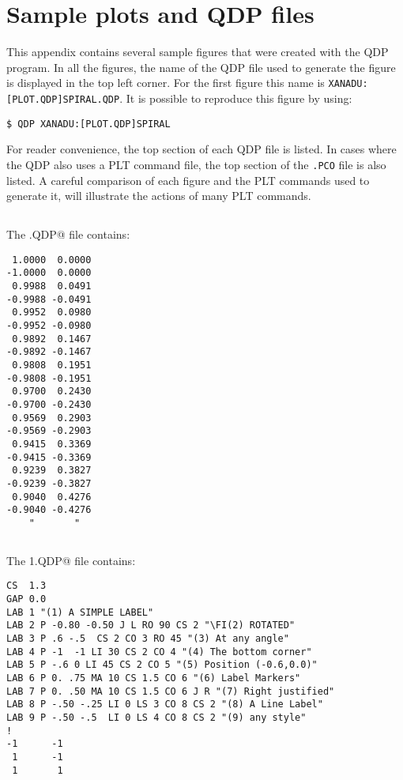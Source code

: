 \chapter{Sample plots and QDP files}
\label{samples}

This appendix contains several sample figures that were created
with the QDP program.
In all the figures, the name of the QDP file used to generate the
figure is displayed in the top left corner.
For the first figure this name is {\tt XANADU:[PLOT.QDP]SPIRAL.QDP}.
It is possible to reproduce this figure by using:
\begin{verbatim}
$ QDP XANADU:[PLOT.QDP]SPIRAL
\end{verbatim}

For reader convenience, the top section of each QDP file is listed.
In cases where the QDP also uses a PLT command file, the top section
of the {\tt .PCO} file is also listed.
A careful comparison of each figure and the PLT commands used to
generate it, will illustrate the actions of many PLT commands.

\newpage
\section*{ }
\vspace{10cm}

\vfill
The \verb@SPIRAL.QDP@ file contains:
{\footnotesize
\begin{verbatim}
 1.0000  0.0000
-1.0000  0.0000
 0.9988  0.0491
-0.9988 -0.0491
 0.9952  0.0980
-0.9952 -0.0980
 0.9892  0.1467
-0.9892 -0.1467
 0.9808  0.1951
-0.9808 -0.1951
 0.9700  0.2430
-0.9700 -0.2430
 0.9569  0.2903
-0.9569 -0.2903
 0.9415  0.3369
-0.9415 -0.3369
 0.9239  0.3827
-0.9239 -0.3827
 0.9040  0.4276
-0.9040 -0.4276
    "       "

\end{verbatim}}


\newpage
\section*{ }
\vspace{10cm}

\vfill
The \verb@FIG1.QDP@ file contains:
{\footnotesize
\begin{verbatim}
CS  1.3
GAP 0.0
LAB 1 "(1) A SIMPLE LABEL"
LAB 2 P -0.80 -0.50 J L RO 90 CS 2 "\FI(2) ROTATED"
LAB 3 P .6 -.5  CS 2 CO 3 RO 45 "(3) At any angle"
LAB 4 P -1  -1 LI 30 CS 2 CO 4 "(4) The bottom corner"
LAB 5 P -.6 0 LI 45 CS 2 CO 5 "(5) Position (-0.6,0.0)"
LAB 6 P 0. .75 MA 10 CS 1.5 CO 6 "(6) Label Markers"
LAB 7 P 0. .50 MA 10 CS 1.5 CO 6 J R "(7) Right justified"
LAB 8 P -.50 -.25 LI 0 LS 3 CO 8 CS 2 "(8) A Line Label"
LAB 9 P -.50 -.5  LI 0 LS 4 CO 8 CS 2 "(9) any style"
!
-1      -1
 1      -1
 1       1
\end{verbatim}}


